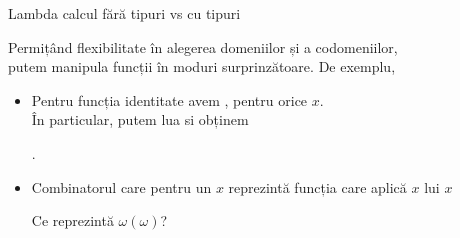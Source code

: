 \documentclass[xcolor=pdftex,romanian,colorlinks]{beamer}
\begin{document}
\begin{frame}{Lambda calcul fără tipuri vs cu tipuri}

\hspace{-.5cm} Permițând flexibilitate în alegerea domeniilor și a codomeniilor, \\
\hspace{-.5cm} putem manipula funcții în moduri surprinzătoare. 
%
De exemplu,

\begin{itemize}
\item Pentru funcția identitate  avem , pentru orice $x$. \\În particular, putem lua  si obținem
\begin{center}
.
\end{center}

\medskip
\item Combinatorul  care pentru un $x$ reprezintă funcția care aplică  $x$ lui $x$ 
\begin{center}
\end{center}
\alert{Ce reprezintă $\omega(\omega)$?}
\pause
\begin{center}
\end{center}
\end{itemize}

\end{frame}
\end{document}
